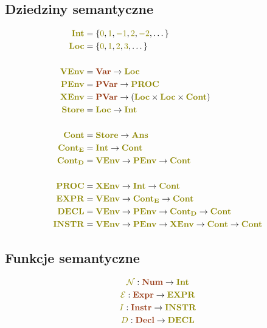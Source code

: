 \documentclass{article}
\newcommand{\syn}[1]{{\bf \textcolor{RawSienna}{#1}}}
\newcommand{\sem}[1]{{\bf \textcolor{olive}{#1}}}
\newcommand{\semcol}[1]{{\textcolor{olive}{#1}}}
\newcommand{\bigeps}{\mathcal{E}}
\begin{document}
\subsection{Dziedziny semantyczne}
\begin{gather*}
	\begin{aligned}
		\sem{Int}    & = \{\semcol{0}, \semcol{1}, \semcol{-1}, \semcol{2}, \semcol{-2}, \dots\} \\
		\sem{Loc}    & = \{\semcol{0}, \semcol{1}, \semcol{2}, \semcol{3}, \dots\}               \\
		\\
		\sem{VEnv}   & = \syn{Var} \to \sem{Loc}                                                 \\
		\sem{PEnv}   & = \syn{PVar} \to \sem{PROC}                                               \\
		\sem{XEnv}   & = \syn{PVar} \to (\sem{Loc} \times \sem{Loc} \times \sem{Cont})           \\
		\sem{Store}  & = \sem{Loc} \to \sem{Int}                                                 \\
		\\
		\sem{Cont}   & = \sem{Store} \to \sem{Ans}                                               \\
		\sem{Cont_E} & = \sem{Int} \to \sem{Cont}                                                \\
		\sem{Cont_D} & = \sem{VEnv} \to \sem{PEnv} \to \sem{Cont}                                \\
		\\
		\sem{PROC}   & = \sem{XEnv} \to \sem{Int} \to \sem{Cont}                                 \\
		\sem{EXPR}   & = \sem{VEnv} \to \sem{Cont_E} \to \sem{Cont}                              \\
		\sem{DECL}   & = \sem{VEnv} \to \sem{PEnv} \to \sem{Cont_D} \to \sem{Cont}               \\
		\sem{INSTR}  & =\sem{VEnv}\to \sem{PEnv}\to \sem{XEnv} \to \sem{Cont} \to \sem{Cont}     \\
	\end{aligned}
\end{gather*}

\subsection{Funkcje semantyczne}
\begin{gather*}
	\semcol{\mathcal{N}}: \syn{Num} \to \sem{Int} \\
	\semcol{\bigeps}: \syn{Expr} \to \sem{EXPR} \\
	\semcol{I}: \syn{Instr} \to \sem{INSTR} \\
	\semcol{D}: \syn{Decl} \to \sem{DECL} \\
\end{gather*}
\end{document}
